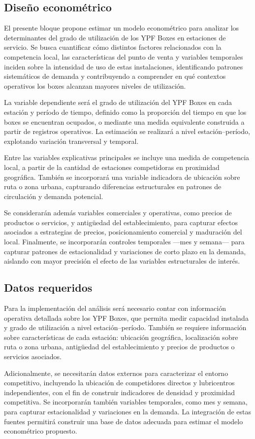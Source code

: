 \subsection{Diseño econométrico}
El presente bloque propone estimar un modelo econométrico para analizar los determinantes del grado de utilización de los YPF Boxes en estaciones de servicio. Se busca cuantificar cómo distintos factores relacionados con la competencia local, las características del punto de venta y variables temporales inciden sobre la intensidad de uso de estas instalaciones, identificando patrones sistemáticos de demanda y contribuyendo a comprender en qué contextos operativos los boxes alcanzan mayores niveles de utilización.

La variable dependiente será el grado de utilización del YPF Boxes en cada estación y período de tiempo, definido como la proporción del tiempo en que los boxes se encuentran ocupados, o mediante una medida equivalente construida a partir de registros operativos. La estimación se realizará a nivel estación–período, explotando variación transversal y temporal.

Entre las variables explicativas principales se incluye una medida de competencia local, a partir de la cantidad de estaciones competidoras en proximidad geográfica. También se incorporará una variable indicadora de ubicación sobre ruta o zona urbana, capturando diferencias estructurales en patrones de circulación y demanda potencial.

Se considerarán además variables comerciales y operativas, como precios de productos o servicios, y antigüedad del establecimiento, para capturar efectos asociados a estrategias de precios, posicionamiento comercial y maduración del local. Finalmente, se incorporarán controles temporales —mes y semana— para capturar patrones de estacionalidad y variaciones de corto plazo en la demanda, aislando con mayor precisión el efecto de las variables estructurales de interés.

\subsection{Datos requeridos}
Para la implementación del análisis será necesario contar con información operativa detallada sobre los YPF Boxes, que permita medir capacidad instalada y grado de utilización a nivel estación–período. También se requiere información sobre características de cada estación: ubicación geográfica, localización sobre ruta o zona urbana, antigüedad del establecimiento y precios de productos o servicios asociados.

Adicionalmente, se necesitarán datos externos para caracterizar el entorno competitivo, incluyendo la ubicación de competidores directos y lubricentros independientes, con el fin de construir indicadores de densidad y proximidad competitiva. Se incorporarán también variables temporales, como mes y semana, para capturar estacionalidad y variaciones en la demanda. La integración de estas fuentes permitirá construir una base de datos adecuada para estimar el modelo econométrico propuesto.